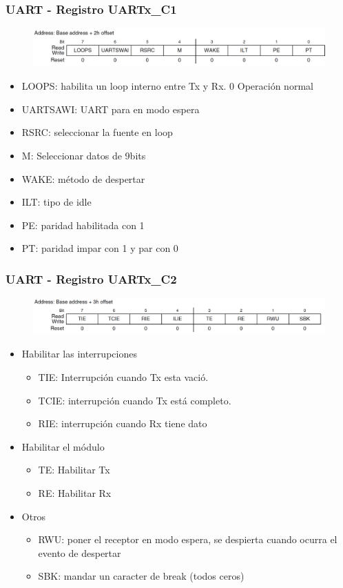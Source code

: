 \documentclass[10.5pt,scale=1.0,t,aspectratio=169,hyperref={pdfpagelabels=false}]{beamer}
\begin{document}
\begin{frame}
	\frametitle{UART - Registro UARTx\_C1}
	{\small
	\begin{figure}
		\centering
		\includegraphics[scale=0.3]{40_UARTC1}
	\end{figure}
	
	\begin{itemize}
		\item LOOPS: habilita un loop interno entre Tx y Rx. 0 Operación normal 
		\item UARTSAWI: UART para en modo espera
		\item RSRC: seleccionar la fuente en loop
		\item M: Seleccionar datos de 9bits
		\item WAKE: método de despertar
		\item ILT: tipo de idle
		\item PE: paridad habilitada con 1
		\item PT: paridad impar con 1 y par con 0
	\end{itemize}
	}
\end{frame}
\begin{frame}
	\frametitle{UART - Registro UARTx\_C2}
	{\small
		\begin{figure}
			\centering
			\includegraphics[scale=0.3]{41_UARTC2}
		\end{figure}
		
		\begin{itemize}
			\item Habilitar las interrupciones
			\begin{itemize}
				\item TIE: Interrupción cuando Tx esta vació.
				\item TCIE: interrupción cuando Tx está completo.
				\item RIE: interrupción cuando Rx tiene dato
			\end{itemize}
			\item Habilitar el módulo
			\begin{itemize}
				\item TE: Habilitar Tx
				\item RE: Habilitar Rx
			\end{itemize}
			\item Otros
			\begin{itemize}
				\item RWU: poner el receptor en modo espera, se despierta cuando ocurra el evento de despertar
				\item SBK: mandar un caracter de break (todos ceros)
			\end{itemize}
		\end{itemize}
	}
\end{frame}
\end{document}
